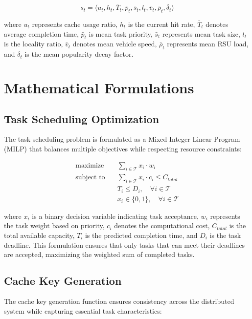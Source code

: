 \documentclass[11pt]{article}
\begin{document}
\begin{equation}
s_t = \langle u_t, h_t, \bar{T}_t, \bar{p}_t, \bar{s}_t, l_t, \bar{v}_t, \bar{\rho}_t, \bar{\delta}_t \rangle
\end{equation}

where $u_t$ represents cache usage ratio, $h_t$ is the current hit rate, $\bar{T}_t$ denotes average completion time, $\bar{p}_t$ is mean task priority, $\bar{s}_t$ represents mean task size, $l_t$ is the locality ratio, $\bar{v}_t$ denotes mean vehicle speed, $\bar{\rho}_t$ represents mean RSU load, and $\bar{\delta}_t$ is the mean popularity decay factor.

\section{Mathematical Formulations}

\subsection{Task Scheduling Optimization}

The task scheduling problem is formulated as a Mixed Integer Linear Program (MILP) that balances multiple objectives while respecting resource constraints:

\begin{align}
\text{maximize} \quad & \sum_{i \in \mathcal{T}} x_i \cdot w_i \\
\text{subject to} \quad & \sum_{i \in \mathcal{T}} x_i \cdot c_i \leq C_{total} \\
& T_i \leq D_i, \quad \forall i \in \mathcal{T} \\
& x_i \in \{0, 1\}, \quad \forall i \in \mathcal{T}
\end{align}

where $x_i$ is a binary decision variable indicating task acceptance, $w_i$ represents the task weight based on priority, $c_i$ denotes the computational cost, $C_{total}$ is the total available capacity, $T_i$ is the predicted completion time, and $D_i$ is the task deadline. This formulation ensures that only tasks that can meet their deadlines are accepted, maximizing the weighted sum of completed tasks.

\subsection{Cache Key Generation}

The cache key generation function ensures consistency across the distributed system while capturing essential task characteristics:
\end{document}
